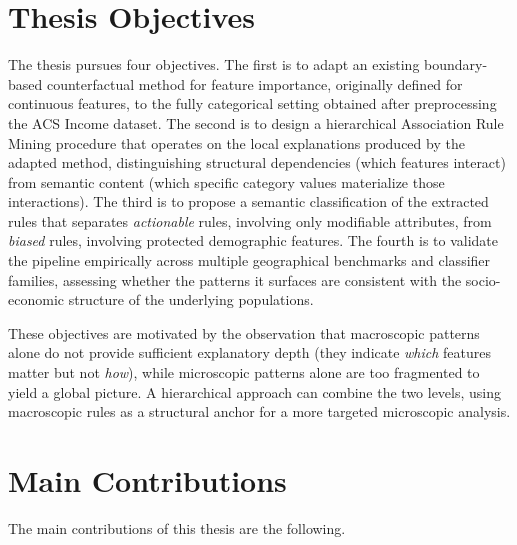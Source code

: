 \section{Thesis Objectives}
\label{sec:intro-objectives}

The thesis pursues four objectives. The first is to adapt an existing boundary-based counterfactual method for feature importance, originally defined for continuous features, to the fully categorical setting obtained after preprocessing the ACS Income dataset. The second is to design a hierarchical Association Rule Mining procedure that operates on the local explanations produced by the adapted method, distinguishing structural dependencies (which features interact) from semantic content (which specific category values materialize those interactions). The third is to propose a semantic classification of the extracted rules that separates \emph{actionable} rules, involving only modifiable attributes, from \emph{biased} rules, involving protected demographic features. The fourth is to validate the pipeline empirically across multiple geographical benchmarks and classifier families, assessing whether the patterns it surfaces are consistent with the socio-economic structure of the underlying populations.

These objectives are motivated by the observation that macroscopic patterns alone do not provide sufficient explanatory depth (they indicate \emph{which} features matter but not \emph{how}), while microscopic patterns alone are too fragmented to yield a global picture. A hierarchical approach can combine the two levels, using macroscopic rules as a structural anchor for a more targeted microscopic analysis.

\section{Main Contributions}
\label{sec:intro-contributions}

The main contributions of this thesis are the following.

